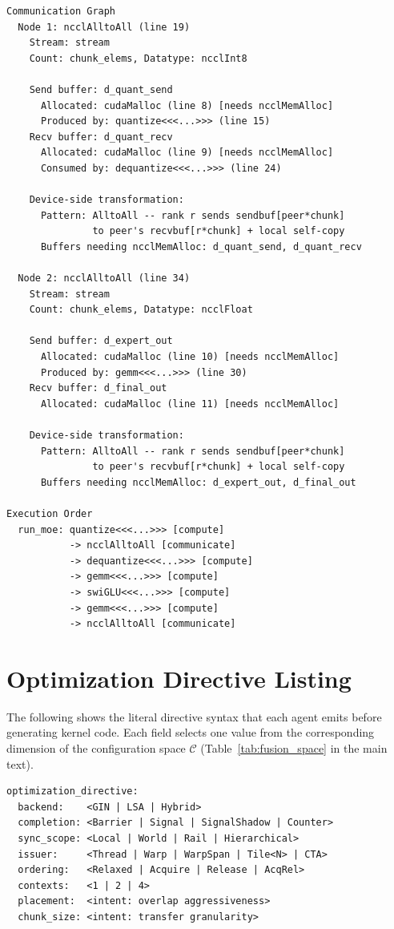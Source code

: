\begin{lstlisting}[style=customc2,caption={Communication dependency graph produced by the static analyzer for Listing~\ref{lst:host_moe}.},label={lst:comm_graph}]
Communication Graph
  Node 1: ncclAlltoAll (line 19)
    Stream: stream
    Count: chunk_elems, Datatype: ncclInt8

    Send buffer: d_quant_send
      Allocated: cudaMalloc (line 8) [needs ncclMemAlloc]
      Produced by: quantize<<<...>>> (line 15)
    Recv buffer: d_quant_recv
      Allocated: cudaMalloc (line 9) [needs ncclMemAlloc]
      Consumed by: dequantize<<<...>>> (line 24)

    Device-side transformation:
      Pattern: AlltoAll -- rank r sends sendbuf[peer*chunk]
               to peer's recvbuf[r*chunk] + local self-copy
      Buffers needing ncclMemAlloc: d_quant_send, d_quant_recv

  Node 2: ncclAlltoAll (line 34)
    Stream: stream
    Count: chunk_elems, Datatype: ncclFloat

    Send buffer: d_expert_out
      Allocated: cudaMalloc (line 10) [needs ncclMemAlloc]
      Produced by: gemm<<<...>>> (line 30)
    Recv buffer: d_final_out
      Allocated: cudaMalloc (line 11) [needs ncclMemAlloc]

    Device-side transformation:
      Pattern: AlltoAll -- rank r sends sendbuf[peer*chunk]
               to peer's recvbuf[r*chunk] + local self-copy
      Buffers needing ncclMemAlloc: d_expert_out, d_final_out

Execution Order
  run_moe: quantize<<<...>>> [compute]
           -> ncclAlltoAll [communicate]
           -> dequantize<<<...>>> [compute]
           -> gemm<<<...>>> [compute]
           -> swiGLU<<<...>>> [compute]
           -> gemm<<<...>>> [compute]
           -> ncclAlltoAll [communicate]
\end{lstlisting}

\section{Optimization Directive Listing}\label{sec:directive_listing}

The following shows the literal directive syntax that each agent emits before generating kernel code. Each field selects one value from the corresponding dimension of the configuration space $\mathcal{C}$ (Table~\ref{tab:fusion_space} in the main text).

\begin{lstlisting}[style=customc2]
optimization_directive:
  backend:    <GIN | LSA | Hybrid>
  completion: <Barrier | Signal | SignalShadow | Counter>
  sync_scope: <Local | World | Rail | Hierarchical>
  issuer:     <Thread | Warp | WarpSpan | Tile<N> | CTA>
  ordering:   <Relaxed | Acquire | Release | AcqRel>
  contexts:   <1 | 2 | 4>
  placement:  <intent: overlap aggressiveness>
  chunk_size: <intent: transfer granularity>
\end{lstlisting}


